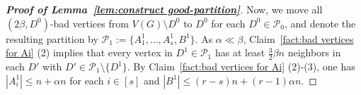 \documentclass[11pt, a4paper]{article}
\theoremstyle{definition}
\newcommand{\<}{\subseteq}
\begin{document}
\begin{proof}[{\bf Proof of Lemma~\ref{lem:construct good-partition}}]
Now, we move all $(2\beta, D^0)$-bad vertices from $V(G)\setminus D^0$ to $D^0$ for each $D^0\in \mathcal{P}_0$, and denote the resulting partition by $\mathcal{P}_1:=\{A_1^1,\ldots,A_s^1,B^1\}$. {As $\alpha\ll\beta$, Claim~\ref{fact:bad vertices for Ai} (2) implies} that every vertex in $D^1\in \mathcal{P}_1$ has at least {$\frac{3}{2}\beta n$} neighbors in each $D'$ with $D'\in \mathcal{P}_1\setminus \{D^1\}$. By Claim~\ref{fact:bad vertices for Ai} (2)-(3), one has $|A_i^1|\leq n+\alpha n$ for each $i\in [s]$ and $|B^1|\leq (r-s)n+(r-1)\alpha n$. %



\end{proof}
\end{document}
